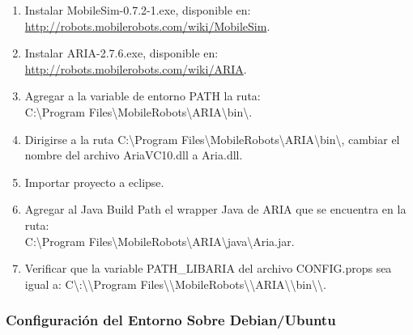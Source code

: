 \documentclass[11pt,twoside,A5]{article}
\newcommand{\sourcecode}[2][\footnotesize]{{\ttfamily#1#2}}
\newcommand{\link}[1]{{\footnotesize\url{#1}}}
\begin{document}
\begin{enumerate}
\item Instalar \sourcecode{MobileSim-0.7.2-1.exe}, disponible en: \\ \link{http://robots.mobilerobots.com/wiki/MobileSim}.
\item Instalar \sourcecode{ARIA-2.7.6.exe}, disponible en: \\ \link{http://robots.mobilerobots.com/wiki/ARIA}.
\item Agregar a la variable de entorno \sourcecode{PATH} la ruta: \\ \sourcecode{C:\textbackslash Program Files\textbackslash MobileRobots\textbackslash ARIA\textbackslash bin\textbackslash}.
\item Dirigirse a la ruta \sourcecode{C:\textbackslash Program Files\textbackslash MobileRobots\textbackslash ARIA\textbackslash bin\textbackslash}, cambiar el nombre del archivo
\sourcecode{AriaVC10.dll} a  \sourcecode{Aria.dll}.
\item Importar proyecto a eclipse.
\item Agregar al \sourcecode{Java Build Path} el wrapper Java de ARIA que se encuentra en la ruta: \\ \sourcecode{C:\textbackslash Program Files\textbackslash MobileRobots\textbackslash ARIA\textbackslash java\textbackslash Aria.jar}.
\item Verificar que la variable  \sourcecode{PATH\_LIBARIA} del archivo  \sourcecode{CONFIG.props} 
	  sea igual a:  \sourcecode{C\textbackslash:\textbackslash\textbackslash Program Files\textbackslash\textbackslash MobileRobots\textbackslash\textbackslash ARIA\textbackslash\textbackslash bin\textbackslash\textbackslash }.
\end{enumerate}

\subsubsection*{Configuración del Entorno Sobre Debian/Ubuntu}
\end{document}
